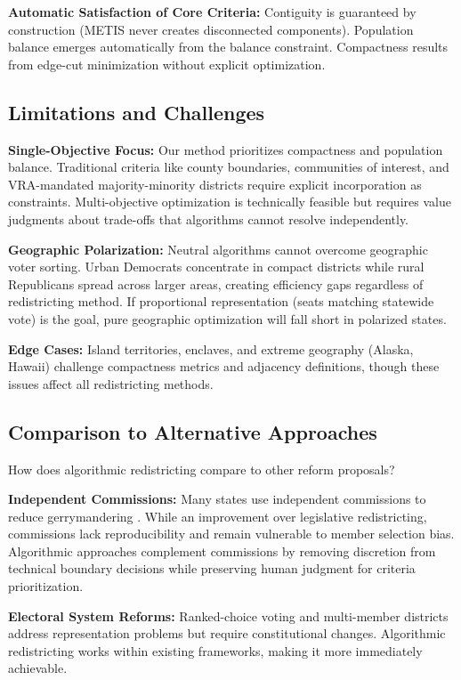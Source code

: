 \textbf{Automatic Satisfaction of Core Criteria:} Contiguity is guaranteed by construction (METIS never creates disconnected components). Population balance emerges automatically from the balance constraint. Compactness results from edge-cut minimization without explicit optimization.
\subsection{Limitations and Challenges}

\textbf{Single-Objective Focus:} Our method prioritizes compactness and population balance. Traditional criteria like county boundaries, communities of interest, and VRA-mandated majority-minority districts require explicit incorporation as constraints. Multi-objective optimization is technically feasible but requires value judgments about trade-offs that algorithms cannot resolve independently.

\textbf{Geographic Polarization:} Neutral algorithms cannot overcome geographic voter sorting. Urban Democrats concentrate in compact districts while rural Republicans spread across larger areas, creating efficiency gaps regardless of redistricting method. If proportional representation (seats matching statewide vote) is the goal, pure geographic optimization will fall short in polarized states.

\textbf{Edge Cases:} Island territories, enclaves, and extreme geography (Alaska, Hawaii) challenge compactness metrics and adjacency definitions, though these issues affect all redistricting methods.
\subsection{Comparison to Alternative Approaches}

How does algorithmic redistricting compare to other reform proposals?

\textbf{Independent Commissions:} Many states use independent commissions to reduce gerrymandering \cite{stephanopoulos2015partisan}. While an improvement over legislative redistricting, commissions lack reproducibility and remain vulnerable to member selection bias. Algorithmic approaches complement commissions by removing discretion from technical boundary decisions while preserving human judgment for criteria prioritization.

\textbf{Electoral System Reforms:} Ranked-choice voting and multi-member districts address representation problems but require constitutional changes. Algorithmic redistricting works within existing frameworks, making it more immediately achievable.


